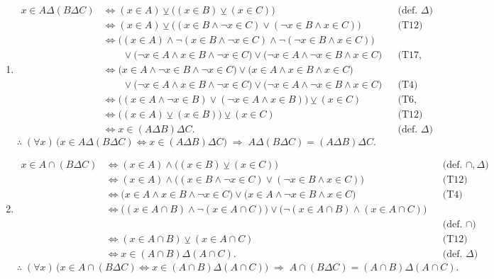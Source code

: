 \documentclass[12pt,letterpaper]{exam}
\begin{document}
\begin{enumerate}
\begin{enumerate}[label=\alph*)]
\item
{\setlength{\jot}{2pt}\small
\[
\begin{aligned}
x\in A\Delta(B\Delta C)
&\iff (x\in A)\veebar\big((x\in B)\veebar(x\in C)\big) && \text{(def.\ $\Delta$)}\\
&\iff (x\in A)\veebar\big((x\in B\land\neg x\in C)\lor(\neg x\in B\land x\in C)\big) && \text{(T12)}\\
&\iff \Big((x\in A)\land\neg(x\in B\land\neg x\in C)\land\neg(\neg x\in B\land x\in C)\Big)\\
&\qquad{}\lor\big(\neg x\in A\land x\in B\land\neg x\in C\big)\lor\big(\neg x\in A\land\neg x\in B\land x\in C\big)
&& \text{(T17, T4)}\\
&\iff \big(x\in A\land\neg x\in B\land\neg x\in C\big)\lor\big(x\in A\land x\in B\land x\in C\big)\\
&\qquad{}\lor\big(\neg x\in A\land x\in B\land\neg x\in C\big)\lor\big(\neg x\in A\land\neg x\in B\land x\in C\big)
&& \text{(T4)}\\
&\iff \Big((x\in A\land\neg x\in B)\lor(\neg x\in A\land x\in B)\Big)\veebar(x\in C)
&& \text{(T6, T3)}\\
&\iff \big((x\in A)\veebar(x\in B)\big)\veebar(x\in C) && \text{(T12)}\\
&\iff x\in (A\Delta B)\Delta C. && \text{(def.\ $\Delta$)}
\end{aligned}
\]
}
\[
\therefore\; (\forall x)\,\big(x\in A\Delta(B\Delta C) \iff x\in (A\Delta B)\Delta C\big)
\;\Rightarrow\; A\Delta(B\Delta C) = (A\Delta B)\Delta C.
\]

\item
{\setlength{\jot}{2pt}\small
\[
\begin{aligned}
x\in A\cap(B\Delta C)
&\iff (x\in A)\land\big((x\in B)\veebar(x\in C)\big) && \text{(def.\ $\cap,\Delta$)}\\
&\iff (x\in A)\land\big((x\in B\land\neg x\in C)\lor(\neg x\in B\land x\in C)\big)
&& \text{(T12)}\\
&\iff \big(x\in A\land x\in B\land\neg x\in C\big)\lor\big(x\in A\land\neg x\in B\land x\in C\big)
&& \text{(T4)}\\
&\iff \Big((x\in A\cap B)\land\neg(x\in A\cap C)\Big)\lor\Big(\neg(x\in A\cap B)\land(x\in A\cap C)\Big)\\
&&& \text{(def.\ $\cap$)}\\
&\iff (x\in A\cap B)\veebar(x\in A\cap C) && \text{(T12)}\\
&\iff x\in (A\cap B)\Delta(A\cap C). && \text{(def.\ $\Delta$)}
\end{aligned}
\]
}
\[
\therefore\; (\forall x)\,\big(x\in A\cap(B\Delta C) \iff x\in (A\cap B)\Delta(A\cap C)\big)
\;\Rightarrow\; A\cap(B\Delta C) = (A\cap B)\Delta(A\cap C).
\]


\end{enumerate}
\end{enumerate}
\end{document}
